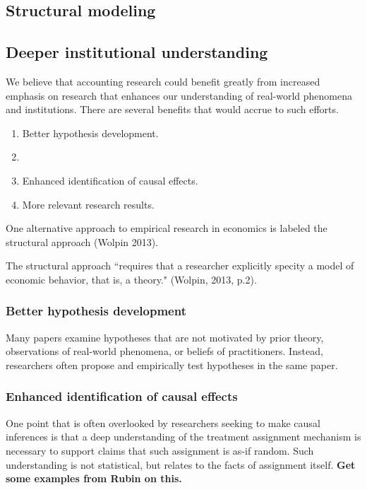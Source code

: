 \documentclass[11pt]{amsart}
\begin{document}
\subsection{Structural modeling}


\subsection{Deeper institutional understanding}

We believe that accounting research could benefit greatly from increased emphasis on research that enhances our understanding of real-world phenomena and institutions. There are several benefits that would accrue to such efforts.

\begin{enumerate}
\item Better hypothesis development.  
\item %
\item Enhanced identification of causal effects.
\item More relevant research results.
\end{enumerate}

One alternative approach to empirical research in economics is labeled the structural approach (Wolpin 2013).

The structural approach ``requires that a researcher explicitly specity a model of economic behavior, that is, a theory." (Wolpin, 2013, p.2).


\subsubsection{Better hypothesis development}
Many papers examine hypotheses that are not motivated by prior theory,  observations of real-world phenomena, or beliefs of practitioners. Instead, researchers often propose and empirically test hypotheses in the same paper.

\subsubsection{Enhanced identification of causal effects}
One point that is often overlooked by researchers seeking to make causal inferences is that a deep understanding of the treatment assignment mechanism is necessary to support claims that such assignment is as-if random. Such understanding is not statistical, but relates to the facts of assignment itself. \textbf{Get some examples from Rubin on this.}
\end{document}
